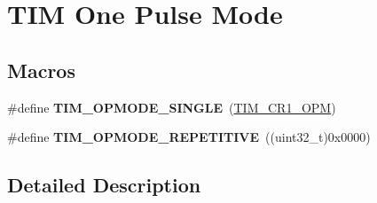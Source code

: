 \hypertarget{group___t_i_m___one___pulse___mode}{}\section{T\+IM One Pulse Mode}
\label{group___t_i_m___one___pulse___mode}
\subsection*{Macros}
\begin{DoxyCompactItemize}
\item 
\#define {\bfseries T\+I\+M\+\_\+\+O\+P\+M\+O\+D\+E\+\_\+\+S\+I\+N\+G\+LE}~(\hyperlink{group___peripheral___registers___bits___definition_ga6d3d1488296350af6d36fbbf71905d29}{T\+I\+M\+\_\+\+C\+R1\+\_\+\+O\+PM})\hypertarget{group___t_i_m___one___pulse___mode_gab0447b341024e86145c7ce0dc2931fc6}{}\label{group___t_i_m___one___pulse___mode_gab0447b341024e86145c7ce0dc2931fc6}

\item 
\#define {\bfseries T\+I\+M\+\_\+\+O\+P\+M\+O\+D\+E\+\_\+\+R\+E\+P\+E\+T\+I\+T\+I\+VE}~((uint32\+\_\+t)0x0000)\hypertarget{group___t_i_m___one___pulse___mode_ga14a7b6f95769c5b430f65189d9c7cfa3}{}\label{group___t_i_m___one___pulse___mode_ga14a7b6f95769c5b430f65189d9c7cfa3}

\end{DoxyCompactItemize}


\subsection{Detailed Description}
